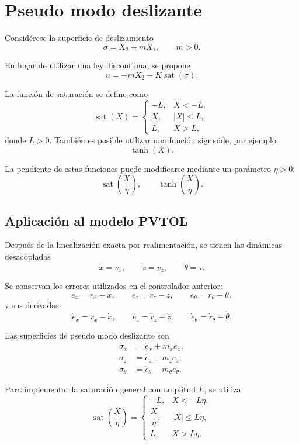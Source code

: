 \clearpage

\section{Pseudo modo deslizante}

Considérese la superficie de deslizamiento
\[
  \boxed{\sigma=X_2+mX_1},
  \qquad m>0.
\]

En lugar de utilizar una ley discontinua, se propone
\[
  \boxed{u=-mX_2-K\operatorname{sat}(\sigma)}.
\]

La función de saturación se define como
\[
  \operatorname{sat}(X)=
  \begin{cases}
    -L, & X<-L,\\
    X, & |X|\leq L,\\
    L, & X>L,
  \end{cases}
\]
donde \(L>0\). También es posible utilizar una función sigmoide, por ejemplo
\[
  \tanh(X).
\]

La pendiente de estas funciones puede modificarse mediante un parámetro
\(\eta>0\):
\[
  \operatorname{sat}\left(\frac{X}{\eta}\right),
  \qquad
  \tanh\left(\frac{X}{\eta}\right).
\]

\subsection{Aplicación al modelo PVTOL}

Después de la linealización exacta por realimentación, se tienen las
dinámicas desacopladas
\[
  \ddot{x}=v_x,\qquad
  \ddot{z}=v_z,\qquad
  \ddot{\theta}=\tau.
\]

Se conservan los errores utilizados en el controlador anterior:
\[
  e_x=r_x-x,\qquad
  e_z=r_z-z,\qquad
  e_\theta=r_\theta-\theta,
\]
y sus derivadas:
\[
  \dot e_x=\dot r_x-\dot x,\qquad
  \dot e_z=\dot r_z-\dot z,\qquad
  \dot e_\theta=\dot r_\theta-\dot\theta.
\]

Las superficies de pseudo modo deslizante son
\begin{align*}
  \sigma_x&=\dot e_x+m_xe_x,\\
  \sigma_z&=\dot e_z+m_ze_z,\\
  \sigma_\theta&=\dot e_\theta+m_\theta e_\theta.
\end{align*}

Para implementar la saturación general con amplitud \(L\), se utiliza
\[
  \operatorname{sat}\left(\frac{X}{\eta}\right)
  =
  \begin{cases}
    -L, & X<-L\eta,\\
    \dfrac{X}{\eta}, & |X|\leq L\eta,\\
    L, & X>L\eta.
  \end{cases}
\]

